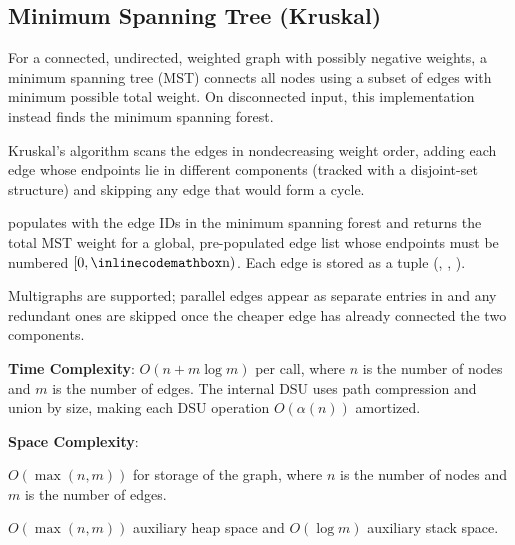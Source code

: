 \subsection{Minimum Spanning Tree (Kruskal)}
\label{sec:4.4.2}
For a connected, undirected, weighted graph with possibly negative weights, a minimum spanning tree (MST) connects all nodes using a subset of edges with minimum possible total weight. On disconnected input, this implementation instead finds the minimum spanning forest.

Kruskal's algorithm scans the edges in nondecreasing weight order, adding each edge whose endpoints lie in different components (tracked with a disjoint-set structure) and skipping any edge that would form a cycle.

\begin{compactitem}
  \item {} populates  with the edge IDs in the minimum spanning forest and returns the total MST weight for a global, pre-populated edge list  whose endpoints must be numbered $[0, {\inlinecodemath{n}})$. Each edge is stored as a tuple (, , ).
\end{compactitem}

Multigraphs are supported; parallel edges appear as separate entries in  and any redundant ones are skipped once the cheaper edge has already connected the two components.

\textbf{Time Complexity}: $O(n + m \log m)$ per call, where $n$ is the number of nodes and $m$ is the number of edges. The internal DSU uses path compression and union by size, making each DSU operation $O(\alpha\left(n\right))$ amortized.

\textbf{Space Complexity}:
\begin{compactitem}
  \item $O(\max\left(n, m\right))$ for storage of the graph, where $n$ is the number of nodes and $m$ is the number of edges.
  \item $O(\max\left(n, m\right))$ auxiliary heap space and $O(\log m)$ auxiliary stack space.
\end{compactitem}

